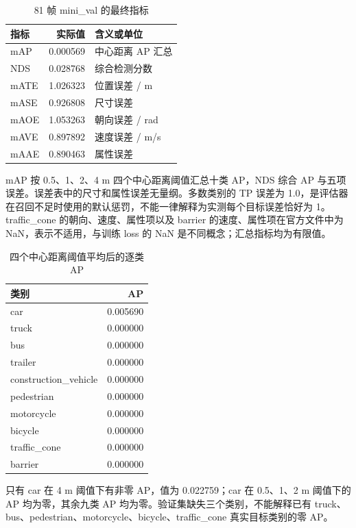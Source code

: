 \documentclass[UTF8,zihao=-4,fontset=windows]{ctexart}
\begin{document}
\begin{table}[H]
\centering
\caption{81 帧 mini\_val 的最终指标}
\label{tab:metrics}
\begin{tabular}{lrl}
\toprule 指标 & 实际值 & 含义或单位 \\
\midrule
mAP & 0.000569 & 中心距离 AP 汇总 \\
NDS & 0.028768 & 综合检测分数 \\
mATE & 1.026323 & 位置误差 / m \\
mASE & 0.926808 & 尺寸误差 \\
mAOE & 1.053263 & 朝向误差 / rad \\
mAVE & 0.897892 & 速度误差 / m/s \\
mAAE & 0.890463 & 属性误差 \\
\bottomrule
\end{tabular}
\end{table}

mAP 按 0.5、1、2、4 m 四个中心距离阈值汇总十类 AP，NDS 综合 AP 与五项误差。误差表中的尺寸和属性误差无量纲。多数类别的 TP 误差为 1.0，是评估器在召回不足时使用的默认惩罚，不能一律解释为实测每个目标误差恰好为 1。traffic\_cone 的朝向、速度、属性项以及 barrier 的速度、属性项在官方文件中为 NaN，表示不适用，与训练 loss 的 NaN 是不同概念；汇总指标均为有限值。

\begin{table}[H]
\centering
\caption{四个中心距离阈值平均后的逐类 AP}
\begin{tabular}{lr}
\toprule 类别 & AP \\
\midrule
car & 0.005690 \\
truck & 0.000000 \\
bus & 0.000000 \\
trailer & 0.000000 \\
construction\_vehicle & 0.000000 \\
pedestrian & 0.000000 \\
motorcycle & 0.000000 \\
bicycle & 0.000000 \\
traffic\_cone & 0.000000 \\
barrier & 0.000000 \\
\bottomrule
\end{tabular}
\end{table}

只有 car 在 4 m 阈值下有非零 AP，值为 0.022759；car 在 0.5、1、2 m 阈值下的 AP 均为零，其余九类 AP 均为零。验证集缺失三个类别，不能解释已有 truck、bus、pedestrian、motorcycle、bicycle、traffic\_cone 真实目标类别的零 AP。
\FloatBarrier
\end{document}
